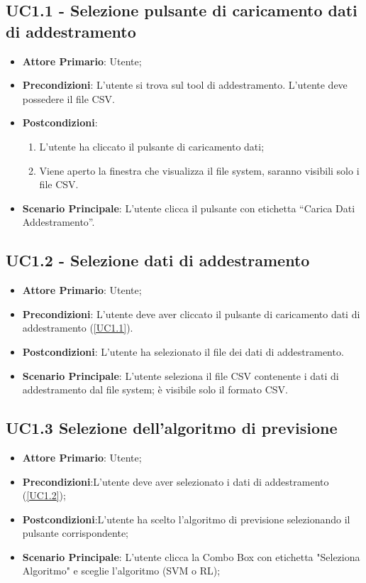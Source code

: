 		\label{par:UC1.1}
		\subsection{UC1.1 - Selezione pulsante di caricamento dati di addestramento}
		\begin{itemize}
			\item\textbf{Attore Primario}: Utente;
			\item\textbf{Precondizioni}: L’utente si trova sul tool di addestramento. L’utente deve possedere il file CSV.
			\item\textbf{Postcondizioni}:
				\begin{enumerate}
					\item L’utente ha cliccato il pulsante di caricamento dati;
					\item Viene aperto la finestra che visualizza il file system, saranno visibili solo i file CSV.
				\end{enumerate}
			\item\textbf{Scenario Principale}: L’utente clicca il pulsante con etichetta “Carica Dati Addestramento”.
		\end{itemize}

		\subsection{UC1.2 - Selezione dati di addestramento }
		\begin{itemize}
			\item\textbf{Attore Primario}: Utente;
			\item\textbf{Precondizioni}: L’utente deve aver cliccato il pulsante di caricamento dati di addestramento (\ref{UC1.1}).
			\item\textbf{Postcondizioni}: L’utente ha selezionato il file dei dati di addestramento.
			\item\textbf{Scenario Principale}: L’utente seleziona il file CSV contenente i dati di addestramento dal file system; è visibile solo il formato CSV.
		\end{itemize}
		
		\subsection{UC1.3 Selezione dell’algoritmo di previsione}
		\begin{itemize}
			\item\textbf{Attore Primario}: Utente;
			\item\textbf{Precondizioni}:L’utente deve aver selezionato i dati di addestramento (\ref{UC1.2}); 
			\item\textbf{Postcondizioni}:L’utente ha scelto l’algoritmo di previsione selezionando il pulsante corrispondente;
			\item\textbf{Scenario Principale}: L’utente clicca la Combo Box con etichetta "Seleziona Algoritmo" e sceglie l’algoritmo (SVM o RL);
		\end{itemize}


